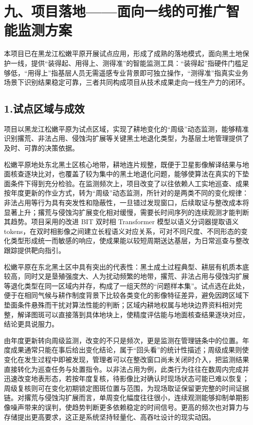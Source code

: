 \section{九、项目落地——面向一线的可推广智能监测方案}

本项目已在黑龙江松嫩平原开展试点应用，形成了成熟的落地模式，面向黑土地保护一线，提供“装得起、用得上、测得准”的智能监测工具：“装得起”指硬件门槛足够低，“用得上”指基层人员无需遥感专业背景即可独立操作，“测得准”指真实业务场景下识别结果稳定可靠，三者共同构成项目从技术成果走向一线生产力的闭环。

\subsection{1.试点区域与成效}

项目以黑龙江松嫩平原为试点区域，实现了耕地变化的“周级”动态监测，能够精准识别撂荒、非法占用、侵蚀沟扩展等关键黑土地退化类型，为基层土地管理提供了及时、可靠的决策依据。

松嫩平原地处东北黑土区核心地带，耕地连片规整，既便于卫星影像解译结果与地面核查逐块比对，也覆盖了较为集中的黑土地退化问题，能够使算法在真实的下垫面条件下得到充分检验。在监测频次上，项目改变了以往依赖人工实地巡查、成果按年度更新的作业方式，转为“周级”动态监测，所针对的是两类不同的变化规律：非法占用等行为具有突发性和隐蔽性，一旦错过发现窗口，后续取证与整改成本将显著上升；撂荒与侵蚀沟扩展变化相对缓慢，需要长时间序列的连续观测才能判断其趋势。项目采用的改进 BIT 双时相 Transformer 模型以语义分词器提取语义 tokens，在双时相影像之间建立长程语义对应关系，可对不同尺度、不同形态的变化类型形成统一而敏感的响应，使成果能以较短周期送达基层，为日常巡查与整改跟踪提供靶向指引。

松嫩平原在东北黑土区中具有突出的代表性：黑土成土过程典型、耕层有机质本底较高，同时又是垦殖强度大、人为扰动频繁的地带，撂荒、非法占用与侵蚀沟扩展等退化类型在同一区域内并存，构成了一组天然的“问题样本集”。试点选在此处，便于在相同气候与耕作制度背景下比较各类变化的影像特征差异，避免因跨区域下垫面条件悬殊而干扰对算法性能的判断；区域内耕地权属与地块边界资料相对完整，解译图斑可以直接落到具体地块上，使精度评估能与地面核查结果逐块对应，结论更具说服力。

由年度更新转向周级监测，改变的不只是频次，更是监测在管理链条中的位置。年度成果通常只能在事后给出变化结论，属于“回头看”的统计性描述；周级成果则使变化在发生过程中即被发现，管理者可以在整改窗口尚未关闭时介入，把监测结果直接转化为巡查任务与处置指令。以非法占用为例，此类行为往往在数周内完成并迅速改变地表形态，若按年度复核，待影像比对确认时现场状态可能已难以恢复；周级复核则可在变化初期锁定图斑位置与范围，为现场取证保留更完整的时间证据链。对撂荒与侵蚀沟扩展而言，单周变化幅度往往很小，连续观测能够抑制单期影像噪声带来的误判，使趋势判断更多依赖稳定的时间信号。更高的频次也对算力与存储提出更高要求，这正是系统坚持轻量化、高吞吐设计的现实动因。

